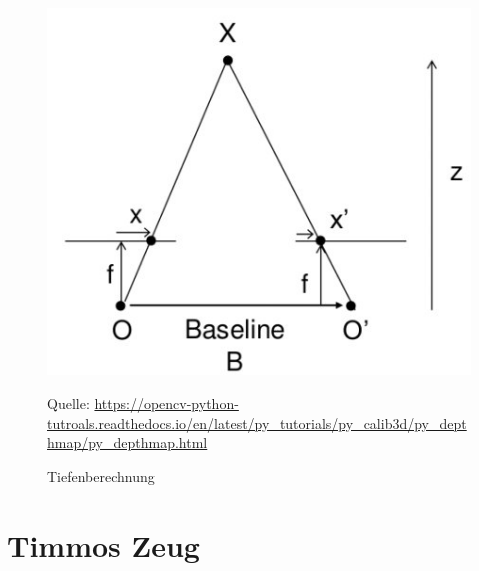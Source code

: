  \begin{figure}[H]
 	\includegraphics[scale=1.0]{bilder/tiefenberechnung}
 	\caption[Tiefenberechnung]{Tiefenberechnung}
 	\small Quelle: \url{https://opencv-python-tutroals.readthedocs.io/en/latest/py_tutorials/py_calib3d/py_depthmap/py_depthmap.html}
 	\label{fig:base}%
 \end{figure}
 
\section{Timmos Zeug} 
\label{sec:timmoszeug}